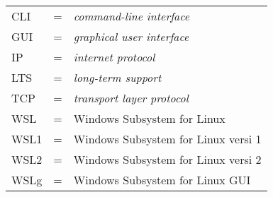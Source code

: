 \begin{tabular}{llp{3in}}
    CLI & \hspace{1.5cm} = & \textit{command-line interface}\\
    GUI & \hspace{1.5cm} = & \textit{graphical user interface}\\
    IP & \hspace{1.5cm} = & \textit{internet protocol}\\
    LTS & \hspace{1.5cm} = & \textit{long-term support}\\
    TCP & \hspace{1.5cm} = & \textit{transport layer protocol}\\
    WSL & \hspace{1.5cm} = & Windows Subsystem for Linux\\
    WSL1 & \hspace{1.5cm} = & Windows Subsystem for Linux versi 1\\
    WSL2 & \hspace{1.5cm} = & Windows Subsystem for Linux versi 2\\
    WSLg & \hspace{1.5cm} = & Windows Subsystem for Linux GUI
\end{tabular}

